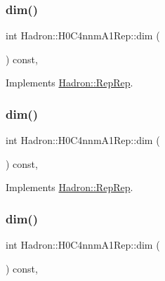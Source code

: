 \subsubsection{\texorpdfstring{dim()}{dim()}\hspace{0.1cm}{\footnotesize\ttfamily [3/5]}}
{\footnotesize\ttfamily int Hadron\+::\+H0\+C4nnm\+A1\+Rep\+::dim (\begin{DoxyParamCaption}{ }\end{DoxyParamCaption}) const\hspace{0.3cm}{\ttfamily [inline]}, {\ttfamily [virtual]}}



Implements \mbox{\hyperlink{structHadron_1_1RepRep_a92c8802e5ed7afd7da43ccfd5b7cd92b}{Hadron\+::\+Rep\+Rep}}.

\mbox{\label{structHadron_1_1H0C4nnmA1Rep_a0457553b469cd5842e489112270a1d05}} 
\subsubsection{\texorpdfstring{dim()}{dim()}\hspace{0.1cm}{\footnotesize\ttfamily [4/5]}}
{\footnotesize\ttfamily int Hadron\+::\+H0\+C4nnm\+A1\+Rep\+::dim (\begin{DoxyParamCaption}{ }\end{DoxyParamCaption}) const\hspace{0.3cm}{\ttfamily [inline]}, {\ttfamily [virtual]}}



Implements \mbox{\hyperlink{structHadron_1_1RepRep_a92c8802e5ed7afd7da43ccfd5b7cd92b}{Hadron\+::\+Rep\+Rep}}.

\mbox{\label{structHadron_1_1H0C4nnmA1Rep_a0457553b469cd5842e489112270a1d05}} 
\subsubsection{\texorpdfstring{dim()}{dim()}\hspace{0.1cm}{\footnotesize\ttfamily [5/5]}}
{\footnotesize\ttfamily int Hadron\+::\+H0\+C4nnm\+A1\+Rep\+::dim (\begin{DoxyParamCaption}{ }\end{DoxyParamCaption}) const\hspace{0.3cm}{\ttfamily [inline]}, {\ttfamily [virtual]}}



